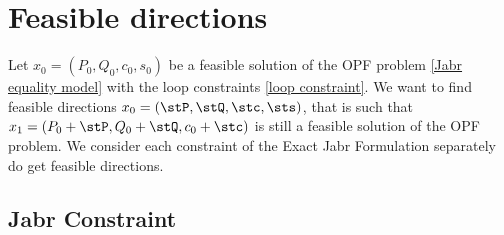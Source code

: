 \documentclass{article}
\newcommand{\gr}[2][]{\todo[color=green!20,#1]{\textsf{G:} #2}}
\begin{document}
	
	
	
	
	
	
	\section{Feasible directions}
	
	Let \(x_0 = (P_0,Q_0,c_0,s_0)\) be a feasible solution of the OPF problem \eqref{Jabr equality model} with the loop constraints \eqref{loop constraint}.
	We want to find feasible directions \(x_0 = (\stP,\stQ,\stc,\sts)\), that is such that \(x_1 = (P_0+\stP,Q_0+\stQ,c_0+\stc)\) is still a feasible solution of the OPF problem.
	We consider each constraint of the Exact Jabr Formulation separately do get feasible directions.
	
	\subsection{Jabr Constraint}
	
\end{document}
